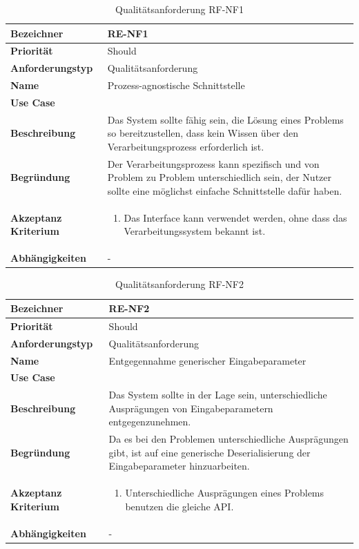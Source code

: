 \begin{table}[ht]
\centering
  \begin{tabular}{ l | p{8cm} }
	\hline
	\rowcolor{gray}
	\textbf{Bezeichner}&	\textbf{RE-NF1}\\ \hline
	\textbf{Priorität} 		&	Should\\ \hline
	\textbf{Anforderungstyp}	&	Qualitätsanforderung\\ \hline
	\textbf{Name} 			&	Prozess-agnostische Schnittstelle\\ \hline
	\textbf{Use Case} 		&	\nameref{table:use_case_1}\\ \hline
	\textbf{Beschreibung} 	&	Das System sollte fähig sein, die Lösung eines Problems so bereitzustellen, dass kein Wissen über den Verarbeitungsprozess erforderlich ist.\\ \hline
	\textbf{Begründung} 		&	Der Verarbeitungsprozess kann spezifisch und von Problem zu Problem unterschiedlich sein, der Nutzer sollte eine möglichst einfache 
							Schnittstelle dafür haben.\\ \hline
	\textbf{Akzeptanz Kriterium}	&	\begin{enumerate}
					\item Das Interface kann verwendet werden, ohne dass das Verarbeitungssystem bekannt ist.
					\end{enumerate}
					\\ \hline
	\textbf{Abhängigkeiten} 	&	-\\ \hline
  \end{tabular}
   \caption{Qualitätsanforderung RF-NF1}\label{table:req_nf_1}
\end{table}

\begin{table}[ht]
\centering
  \begin{tabular}{ l | p{8cm} }
	\hline
	\rowcolor{gray}
	\textbf{Bezeichner}&	\textbf{RE-NF2}\\ \hline
	\textbf{Priorität} 		&	Should\\ \hline
	\textbf{Anforderungstyp}	&	Qualitätsanforderung\\ \hline
	\textbf{Name} 			&	Entgegennahme generischer Eingabeparameter\\ \hline
	\textbf{Use Case} 		&	\nameref{table:use_case_1}\\ \hline
	\textbf{Beschreibung} 	&	Das System sollte in der Lage sein, unterschiedliche Ausprägungen von Eingabeparametern entgegenzunehmen.\\ \hline
	\textbf{Begründung} 		&	Da es bei den Problemen unterschiedliche Ausprägungen gibt, ist auf eine generische Deserialisierung der Eingabeparameter hinzuarbeiten.\\ \hline
	\textbf{Akzeptanz Kriterium}	&	\begin{enumerate}
					\item Unterschiedliche Ausprägungen eines Problems benutzen die gleiche API.
					\end{enumerate}
					\\ \hline
	\textbf{Abhängigkeiten} 	&	-\\ \hline
  \end{tabular}
   \caption{Qualitätsanforderung RF-NF2}\label{table:req_nf_2}
\end{table}

